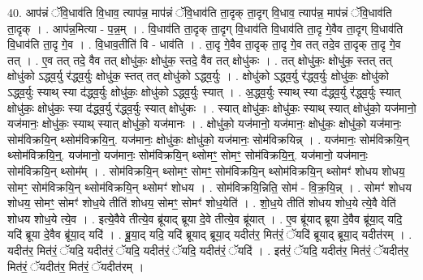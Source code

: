 \documentclass[17pt]{extarticle}
\begin{document}
40. आप॑न्नं ॅवि॒धाव॑ति वि॒धाव॒ त्याप॑न्न॒ माप॑न्नं ॅवि॒धाव॑ति ता॒दृक् ता॒दृग् वि॒धाव॒ त्याप॑न्न॒ माप॑न्नं ॅवि॒धाव॑ति ता॒दृक् । . आप॑न्न॒मित्या - प॒न्न॒म् । . वि॒धाव॑ति ता॒दृक् ता॒दृग् वि॒धाव॑ति वि॒धाव॑ति ता॒दृ गे॒वैव ता॒दृग् वि॒धाव॑ति वि॒धाव॑ति ता॒दृ गे॒व । . वि॒धाव॒तीति॑ वि - धाव॑ति । . ता॒दृ गे॒वैव ता॒दृक् ता॒दृ गे॒व तत् तदे॒व ता॒दृक् ता॒दृ गे॒व तत् । . ए॒व तत् तदे॒ वैव तत् क्षोधु॑कः॒ क्षोधु॑क॒ स्तदे॒ वैव तत् क्षोधु॑कः । . तत् क्षोधु॑कः॒ क्षोधु॑क॒ स्तत् तत् क्षोधु॑को ऽद्ध्व॒र्यु र॑द्ध्व॒र्युः क्षोधु॑क॒ स्तत् तत् क्षोधु॑को ऽद्ध्व॒र्युः । . क्षोधु॑को ऽद्ध्व॒र्यु र॑द्ध्व॒र्युः क्षोधु॑कः॒ क्षोधु॑को ऽद्ध्व॒र्युः स्याथ् स्या द॑द्ध्व॒र्युः क्षोधु॑कः॒ क्षोधु॑को ऽद्ध्व॒र्युः स्यात् । . अ॒द्ध्व॒र्युः स्याथ् स्या द॑द्ध्व॒र्यु र॑द्ध्व॒र्युः स्यात् क्षोधु॑कः॒ क्षोधु॑कः॒ स्या द॑द्ध्व॒र्यु र॑द्ध्व॒र्युः स्यात् क्षोधु॑कः । . स्यात् क्षोधु॑कः॒ क्षोधु॑कः॒ स्याथ् स्यात् क्षोधु॑को॒ यज॑मानो॒ यज॑मानः॒ क्षोधु॑कः॒ स्याथ् स्यात् क्षोधु॑को॒ यज॑मानः । . क्षोधु॑को॒ यज॑मानो॒ यज॑मानः॒ क्षोधु॑कः॒ क्षोधु॑को॒ यज॑मानः॒ सोम॑विक्रयि॒न् थ्सोम॑विक्रयि॒न्॒. यज॑मानः॒ क्षोधु॑कः॒ क्षोधु॑को॒ यज॑मानः॒ सोम॑विक्रयिन्न् । . यज॑मानः॒ सोम॑विक्रयि॒न् थ्सोम॑विक्रयि॒न्॒. यज॑मानो॒ यज॑मानः॒ सोम॑विक्रयि॒न् थ्सोमꣳ॒॒ सोमꣳ॒॒ सोम॑विक्रयि॒न्॒. यज॑मानो॒ यज॑मानः॒ सोम॑विक्रयि॒न् थ्सोम᳚म् । . सोम॑विक्रयि॒न् थ्सोमꣳ॒॒ सोमꣳ॒॒ सोम॑विक्रयि॒न् थ्सोम॑विक्रयि॒न् थ्सोमꣳ॑ शोधय शोधय॒ सोमꣳ॒॒ सोम॑विक्रयि॒न् थ्सोम॑विक्रयि॒न् थ्सोमꣳ॑ शोधय । . सोम॑विक्रयि॒न्निति॒ सोम॑ - वि॒क्र॒यि॒न्न् । . सोमꣳ॑ शोधय शोधय॒ सोमꣳ॒॒ सोमꣳ॑ शोध॒ये तीति॑ शोधय॒ सोमꣳ॒॒ सोमꣳ॑ शोध॒येति॑ । . शो॒ध॒ये तीति॑ शोधय शोध॒ये त्ये॒वै वेति॑ शोधय शोध॒ये त्ये॒व । . इत्ये॒वैवे तीत्ये॒व ब्रू॑याद् ब्रूया दे॒वे तीत्ये॒व ब्रू॑यात् । . ए॒व ब्रू॑याद् ब्रूया दे॒वैव ब्रू॑या॒द् यदि॒ यदि॑ ब्रूया दे॒वैव ब्रू॑या॒द् यदि॑ । . ब्रू॒या॒द् यदि॒ यदि॑ ब्रूयाद् ब्रूया॒द् यदीत॑र॒ मित॑रं॒ ॅयदि॑ ब्रूयाद् ब्रूया॒द् यदीत॑रम् । . यदीत॑र॒ मित॑रं॒ ॅयदि॒ यदीत॑रं॒ ॅयदि॒ यदीत॑रं॒ ॅयदि॒ यदीत॑रं॒ ॅयदि॑ । . इत॑रं॒ ॅयदि॒ यदीत॑र॒ मित॑रं॒ ॅयदीत॑र॒ मित॑रं॒ ॅयदीत॑र॒ मित॑रं॒ ॅयदीत॑रम् । \newline
\pagebreak
{}
\end{document}
